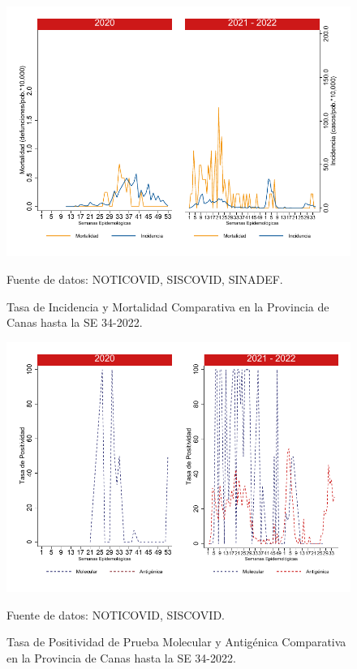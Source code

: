 \documentclass[12pt,a4paper,openany]{book}
\begin{document}
	
	\begin{figure}[h]
		\caption{Tasa de Incidencia y Mortalidad Comparativa en la Provincia de Canas hasta la SE 34-2022.}\label{fig:inc_mort_canas}
		\begin{center}
			\includegraphics[width=0.85\linewidth]{../figuras/incidencia_mortalidad_20_21_4.pdf}
		\end{center}
		{\footnotesize {Fuente de datos: NOTICOVID, SISCOVID, SINADEF.}}
	\end{figure}
	
	\begin{figure}[h]
		\caption{Tasa de Positividad de Prueba Molecular y Antigénica Comparativa en la Provincia de Canas hasta la SE 34-2022.}\label{fig:positividad_canas}
		\begin{center}
			\includegraphics[width=0.7\linewidth]{../figuras/positividad_20_21_4.pdf}
		\end{center}
		{\footnotesize {Fuente de datos: NOTICOVID, SISCOVID.}}
	\end{figure}
	
\end{document}
